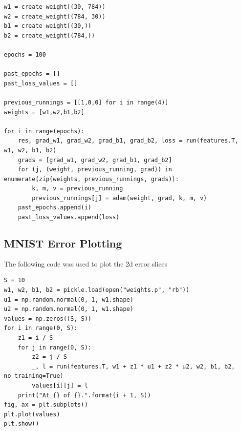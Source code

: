 \documentclass[fleqn]{article}
\begin{document}
\begin{verbatim}
w1 = create_weight((30, 784))
w2 = create_weight((784, 30))
b1 = create_weight((30,))
b2 = create_weight((784,))

epochs = 100

past_epochs = []
past_loss_values = []

previous_runnings = [[1,0,0] for i in range(4)]
weights = [w1,w2,b1,b2]

for i in range(epochs):
    res, grad_w1, grad_w2, grad_b1, grad_b2, loss = run(features.T, w1, w2, b1, b2)
    grads = [grad_w1, grad_w2, grad_b1, grad_b2]
    for (j, (weight, previous_running, grad)) in enumerate(zip(weights, previous_runnings, grads)):
        k, m, v = previous_running
        previous_runnings[j] = adam(weight, grad, k, m, v)
    past_epochs.append(i)
    past_loss_values.append(loss)

\end{verbatim}

\subsection*{MNIST Error Plotting}
The following code was used to plot the 2d error slices
\begin{verbatim}
S = 10
w1, w2, b1, b2 = pickle.load(open("weights.p", "rb"))
u1 = np.random.normal(0, 1, w1.shape)
u2 = np.random.normal(0, 1, w1.shape)
values = np.zeros((S, S))
for i in range(0, S):
    z1 = i / S
    for j in range(0, S):
        z2 = j / S
        _, l = run(features.T, w1 + z1 * u1 + z2 * u2, w2, b1, b2, no_training=True)
        values[i][j] = l
    print("At {} of {}.".format(i + 1, S))        
fig, ax = plt.subplots() 
plt.plot(values)
plt.show()
\end{verbatim}
\end{document}
